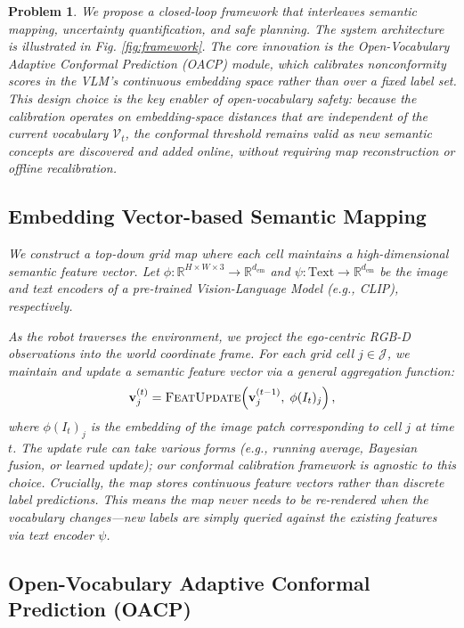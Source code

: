\documentclass[letterpaper, 10 pt, conference]{ieeeconf}  %
\newtheorem{myprob}{\bf Problem}
\begin{document}
\begin{myprob}
We propose a closed-loop framework that interleaves semantic mapping, uncertainty quantification, and safe planning. The system architecture is illustrated in Fig. \ref{fig:framework}. The core innovation is the Open-Vocabulary Adaptive Conformal Prediction (OACP) module, which calibrates nonconformity scores \textit{in the VLM's continuous embedding space} rather than over a fixed label set. This design choice is the key enabler of open-vocabulary safety: because the calibration operates on embedding-space distances that are independent of the current vocabulary $\mathcal{V}_t$, the conformal threshold remains valid as new semantic concepts are discovered and added online, without requiring map reconstruction or offline recalibration.

\subsection{Embedding Vector-based Semantic Mapping}
\label{subsec:mapping}

We construct a top-down grid map where each cell maintains a high-dimensional semantic feature vector. Let $\phi: \mathbb{R}^{H \times W \times 3} \to \mathbb{R}^{d_{\text{em}}}$ and $\psi: \text{Text} \to \mathbb{R}^{d_{\text{em}}}$ be the image and text encoders of a pre-trained Vision-Language Model (e.g., CLIP), respectively.

As the robot traverses the environment, we project the ego-centric RGB-D observations into the world coordinate frame. For each grid cell $j \in \mathcal{J}$, we maintain and update a semantic feature vector via a general aggregation function:
\begin{equation}
    \mathbf{v}_j^{(t)} = \textsc{FeatUpdate}\!\left(\mathbf{v}_j^{(t-1)},\; \phi(I_t)_j\right),
    \label{eq:vlm_update}
\end{equation}
where $\phi(I_t)_j$ is the embedding of the image patch corresponding to cell $j$ at time $t$. The update rule can take various forms (e.g., running average, Bayesian fusion, or learned update); our conformal calibration framework is agnostic to this choice. Crucially, the map stores continuous feature vectors rather than discrete label predictions. This means \textit{the map never needs to be re-rendered when the vocabulary changes}---new labels are simply queried against the existing features via text encoder $\psi$.

\subsection{Open-Vocabulary Adaptive Conformal Prediction (OACP)}
\label{subsec:oacp}


\end{myprob}
\end{document}
